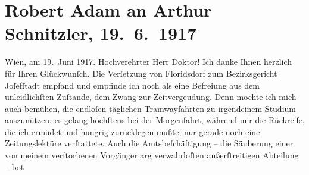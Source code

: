 

         
         \renewcommand{\erwaehntePersonen}{Personen: Robert Adam, Richard Beer, Alexandre père Dumas, Aemilius Hacker, Viktor Franz Patzner, Maria Pollak}
         \renewcommand{\erwaehnteInstitutionen}{Institutionen: Bezirksgericht Wien Josefstadt}
         \renewcommand{\erwaehnteOrte}{Orte: Steiermark, VIII., Josefstadt, Wien, XXI., Floridsdorf, Zistersdorf}
         \renewcommand{\erwaehnteWerke}{Werke: Das Ende des Judas, Meine Memoiren}
               \section[Robert Adam an Arthur Schnitzler, 19. 6. 1917]{ Robert Adam an Arthur Schnitzler, 19. 6. 1917}\nopagebreak{}\rehead{ }\begin{ledgroupsized}[t]{13cm}\normalsize\beginnumbering \toendnotes[C]{\smallbreak\pagebreak[2]} 
\toendnotes[C]{\smallbreak}\pstart
           \raggedleft{}{\pb}Wien, am 19. Juni 1917. \pend
           \pstart{}Hochverehrter Herr Doktor!\pend\pstart
           Ich danke Ihnen herzlich für Ihren Glückwunſch. Die Verſetzung von Floridsdorf zum Bezirksgericht Joſefſtadt empfand und empfinde ich noch als eine Befreiung aus dem unleidlichſten
               Zuſtande, dem Zwang zur Zeitvergeudung. Denn mochte ich mich auch bemühen, die
               endloſen täglichen Tramwayfahrten zu irgendeinem Studium auszunützen, es gelang
               höchſtens bei der Morgenfahrt, während mir die Rückreiſe, die ich ermüdet und hungrig
               zurücklegen mußte, nur gerade noch eine Zeitungslektüre {\pb}verſtattete. Auch die Amtsbeſchäftigung – die
               Säuberung einer von meinem verſtorbenen Vorgänger arg verwahrloſten außerſtreitigen Abteilung – bot

\end{ledgroupsized}
